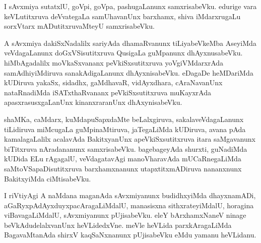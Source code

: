 \documentclass{article}
\begin{document}
\begin{mn}%
I sAvxmiya sutatxlU, goVpi, goVpa, pashugaLanunx samxrisabeVku. edurige vara keVLutitxruva 
deVvategaLa samUhavanUnx barxhamx, shiva iMdarxrugaLu sorxVtarx mADutitxruvaMteyU 
samxrisabeVku.
\end{mn}

\begin{mn}%
A sAvxmiya dakiSxNadalilx sariyAda dhamaRvanunx tiLiyabeVkeMba AseyiMda veVdagaLanunx 
doGxVSisutitxruva QusigaLa guMpanunx dhAyxnusabeVku. hiMbAgadalilx moVkaSxvananx 
peVkiSxsutitxruva yoVgiVMdarxrAda samAdhiyiMdiruva sanakAdigaLanunx dhAyxnisabeVku. 
eDagaDe heMDariMda kUDiruva yakaSx, sidadhx, gaMdhavaR, vidAyxdhara, cAraNavanUnx 
nataRnadiMda iSATxthaRvananx peVkiSxsutitxruva muKayxrAda apasxrasusxgaLanUnx 
kinanxraranUnx dhAxynisabeVku.
\end{mn}

\begin{mn}%
shaMKa, caMdarx, kuMdapuSapxdaMte beLalxgiruva, sakalaveVdagaLanunx tiLidiruva miMcugaLa 
guMpinaMtiruva, jaTegaLiMda kUDiruva, avana pAda kamalagaLalilx acalavAda BakitxyanUnx 
apeVkiSxsutitxruva itara saMgavanunx biTitxruva nAradananunx samxrisabeVku. bagebageyAda 
shurxti, guNadiMda kUDida ELu rAgagalU, veVdagatavAgi manoVharavAda mUCaRnegaLiMda 
saMtoVSapaDisutitxruva barxhamxnanunx utapxtitxmADiruva nananxnunx BakitxyiMda 
ciMtisabeVku.
\end{mn}

\begin{mn}%
I riVtiyAgi A naMdana maganAda sAvxmiyanunx budidhxyiMda dhayxnamADi, 
aGaRyxpAdAyxduyxpacAragaLiMdalU, manasisxna sithxrateyiMdalU, horagina viBavagaLiMdalU, 
sAvxmiyanunx pUjisabeVku. eleY bArxhamxNaneV ninage beVkAdudelalxvanUnx heVLidedxVne. 
meVle heVLida parxkAragaLiMda BagavaMtanAda shirxV kaqSaNxnanunx pUjisabeVku eMdu yamanu 
heVLidanu.
\end{mn}

\end{document}
